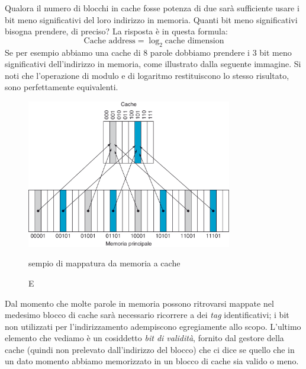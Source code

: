 \documentclass[class=book, crop=false, oneside]{standalone}
\begin{document}
Qualora il numero di blocchi in cache fosse potenza di due sarà sufficiente usare i bit meno significativi del loro indirizzo in memoria. Quanti bit meno significativi bisogna prendere, di preciso? La risposta è in questa formula:
\begin{equation*}
  \textrm{Cache address}=\log_2 \textrm{cache dimension}
\end{equation*}
Se per esempio abbiamo una cache di 8 parole dobbiamo prendere i 3 bit meno significativi dell'indirizzo in memoria, come illustrato dalla seguente immagine.
Si noti che l'operazione di modulo e di logaritmo restituiscono lo stesso risultato, sono perfettamente equivalenti.
\begin{figure}[H]
  \centering
  \includegraphics[width=0.8\textwidth,keepaspectratio]{logad.png}
  \caption Esempio di mappatura da memoria a cache
\end{figure}
Dal momento che molte parole in memoria possono ritrovarsi mappate nel medesimo blocco di cache sarà necessario ricorrere a dei \emph{tag} identificativi; i bit non utilizzati per l'indirizzamento adempiscono egregiamente allo scopo. L'ultimo elemento che vediamo è un cosiddetto \emph{bit di validità}, fornito dal gestore della cache (quindi non prelevato dall'indirizzo del blocco) che ci dice se quello che in un dato momento abbiamo memorizzato in un blocco di cache sia valido o meno.
\end{document}
